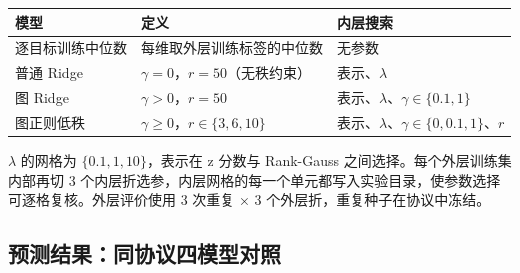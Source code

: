 \documentclass[11pt,a4paper]{article}
\begin{document}
{
\begin{longtable}[]{@{}
  >{\raggedright\arraybackslash}p{}
  >{\raggedright\arraybackslash}p{}
  >{\raggedright\arraybackslash}p{}@{}}
\toprule\noalign{}
\begin{minipage}[b]{\linewidth}\raggedright
模型
\end{minipage} & \begin{minipage}[b]{\linewidth}\raggedright
定义
\end{minipage} & \begin{minipage}[b]{\linewidth}\raggedright
内层搜索
\end{minipage} \\
\midrule\noalign{}
\endhead
\bottomrule\noalign{}
\endlastfoot
逐目标训练中位数 & 每维取外层训练标签的中位数 & 无参数 \\
普通 Ridge & \(\gamma=0\)，\(r=50\)（无秩约束） & 表示、\(\lambda\) \\
图 Ridge & \(\gamma>0\)，\(r=50\) &
表示、\(\lambda\)、\(\gamma\in\{0.1,1\}\) \\
图正则低秩 & \(\gamma\ge0\)，\(r\in\{3,6,10\}\) &
表示、\(\lambda\)、\(\gamma\in\{0,0.1,1\}\)、\(r\) \\
\end{longtable}
}

\(\lambda\) 的网格为 \(\{0.1,1,10\}\)，表示在 z 分数与 Rank-Gauss
之间选择。每个外层训练集内部再切 3
个内层折选参，内层网格的每一个单元都写入实验目录，使参数选择可逐格复核。外层评价使用
3 次重复 × 3 个外层折，重复种子在协议中冻结。

\subsection{预测结果：同协议四模型对照}\label{ux9884ux6d4bux7ed3ux679cux540cux534fux8baeux56dbux6a21ux578bux5bf9ux7167}
\end{document}
